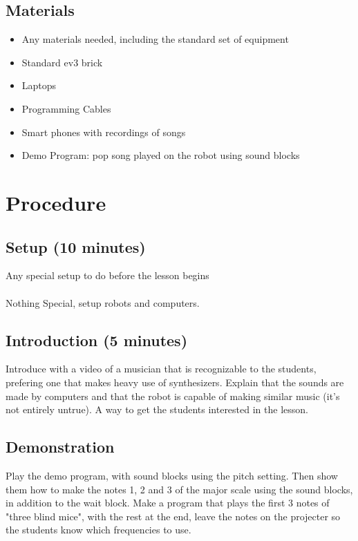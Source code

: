 \documentclass{lessonplan}
\begin{document}
    \subsection{Materials}
      \begin{itemize}
        \item Any materials needed, including the standard set of
          equipment
        \item Standard ev3 brick
        \item Laptops
        \item Programming Cables
        \item Smart phones with recordings of songs
        \item Demo Program: pop song played on the robot using sound
          blocks
      \end{itemize}
  \section{Procedure}
    \subsection{Setup (10 minutes)}
      Any special setup to do before the lesson begins
      \paragraph{}
      Nothing Special, setup robots and computers.
    \subsection{Introduction (5 minutes)}
      Introduce with a video of a musician that is recognizable to the
      students, prefering one that makes heavy use of synthesizers.
      Explain that the sounds are made by computers and that the robot
      is capable of making similar music (it's not entirely untrue).
      A way to get the students interested in the lesson.
    \subsection{Demonstration}
      Play the demo program, with sound blocks using the pitch
      setting.  Then show them how to make the notes 1, 2 and 3 of the
      major scale using the sound blocks, in addition to the wait
      block.  Make a program that plays the first 3 notes of "three
      blind mice", with the rest at the end, leave the notes on the
      projecter so the students know which frequencies to use.
\end{document}
